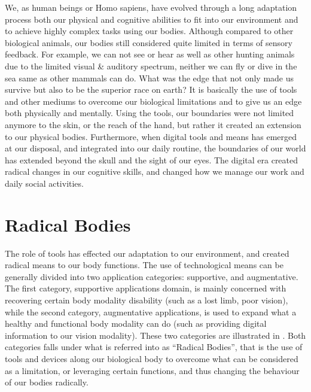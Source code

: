 We, as human beings or Homo sapiens, have evolved through a long adaptation process both our physical and cognitive abilities to fit into our environment and to achieve highly complex tasks using our bodies. Although compared to other biological animals, our bodies still considered quite limited in terms of sensory feedback. For example, we can not see or hear as well as other hunting animals due to the limited visual \& auditory spectrum, neither we can fly or dive in the sea same as other mammals can do. What was the edge that not only made us survive but also to be the superior race on earth? It is basically the use of tools and other mediums to overcome our biological limitations and to give us an edge both physically and mentally. Using the tools, our boundaries were not limited anymore to the skin, or the reach of the hand, but rather it created an extension to our physical bodies. Furthermore, when digital tools and means has emerged at our disposal, and integrated into our daily routine, the boundaries of our world has extended beyond the skull and the sight of our eyes. The digital era created radical changes in our cognitive skills, and changed how we manage our work and daily social activities. %

\section{Radical Bodies}

The role of tools has effected our adaptation to our environment, and created radical means to our body functions. The use of technological means can be generally divided into two application categories: supportive, and augmentative. The first category, supportive applications domain, is mainly concerned with recovering certain body modality disability (such as a lost limb, poor vision), while the second category, augmentative applications, is used to expand what a healthy and functional body modality can do (such as providing digital information to our vision modality). These two categories are illustrated in . Both categories falls under what is referred into as ``Radical Bodies'', that is the use of tools and devices along our biological body to overcome what can be considered as a limitation, or leveraging certain functions, and thus changing the behaviour of our bodies radically. 

